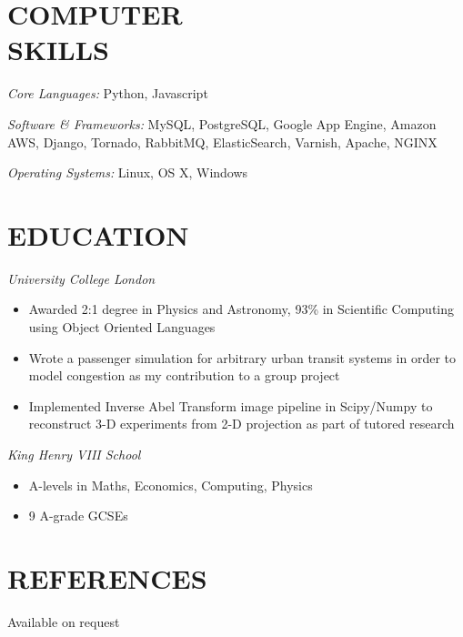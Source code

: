 \documentclass[margin, 10pt]{res}
\begin{document}
\begin{resume}

\section{COMPUTER \\ SKILLS}

{\sl Core Languages:}
Python, Javascript

{\sl Software \& Frameworks:}
MySQL, PostgreSQL, Google App Engine, Amazon AWS, Django, Tornado, RabbitMQ, ElasticSearch, Varnish, Apache, NGINX

{\sl Operating Systems:} Linux, OS X, Windows


\section{EDUCATION}

{\sl University College London} \\
\begin{itemize} \itemsep -2pt %
\item Awarded 2:1 degree in Physics and Astronomy, 93\% in Scientific Computing using Object Oriented Languages
\item Wrote a passenger simulation for arbitrary urban transit systems in order to model congestion as my contribution to a group project
\item Implemented Inverse Abel Transform image pipeline in Scipy/Numpy to reconstruct 3-D experiments from 2-D projection as part of tutored research
\end{itemize}

{\sl King Henry VIII School} \\
\begin{itemize}
\item A-levels in Maths, Economics, Computing, Physics
\item 9 A-grade GCSEs
\end{itemize}

\section{REFERENCES}
Available on request

\end{resume}
\end{document}
